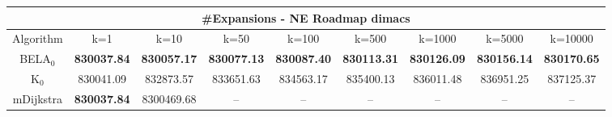 \begin{tabular}{c|cccccccc}\toprule
\multicolumn{9}{c}{#Expansions - NE Roadmap dimacs}\\ \midrule
Algorithm & k=1 & k=10 & k=50 & k=100 & k=500 & k=1000 & k=5000 & k=10000 \\ \midrule
BELA$_0$ & \textbf{830037.84} & \textbf{830057.17} & \textbf{830077.13} & \textbf{830087.40} & \textbf{830113.31} & \textbf{830126.09} & \textbf{830156.14} & \textbf{830170.65} \\
K$_0$ & 830041.09 & 832873.57 & 833651.63 & 834563.17 & 835400.13 & 836011.48 & 836951.25 & 837125.37 \\
mDijkstra & \textbf{830037.84} & 8300469.68 & -- & -- & -- & -- & -- & -- \\ \bottomrule 
\end{tabular}
